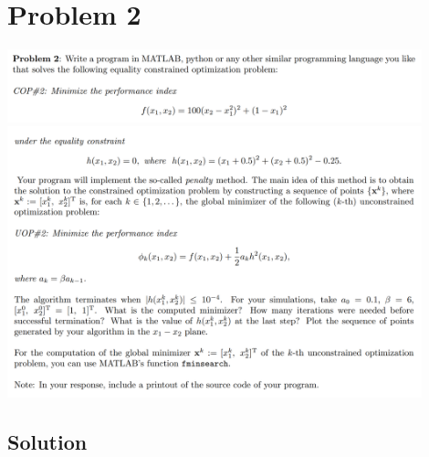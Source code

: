 \documentclass[conf]{new-aiaa}
\begin{document}
\newpage
\section*{Problem 2}

\begin{center}
	\includegraphics[width=0.9\textwidth]{P2_1.png}
	\vspace{1mm}
	\includegraphics[width=0.9\textwidth]{P2_2.png}
\end{center}



\subsection{Solution}
\end{document}
